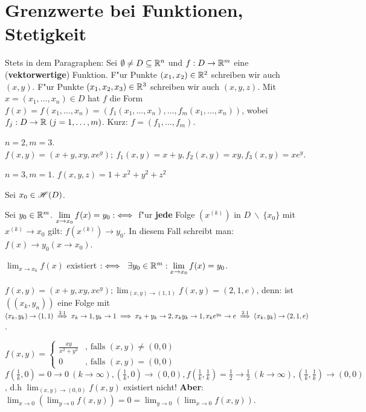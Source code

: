 \documentclass[a4paper,twoside,DIV15,BCOR12mm,chapterprefix=true,headings=twolinechapter]{scrbook}
\begin{document}
\chapter{Grenzwerte bei Funktionen, Stetigkeit}

\begin{vereinbarung}
Stets in dem Paragraphen: Sei $\emptyset \ne D \subseteq \mathbb{R}^n$ und $f: D\to\mathbb{R}^m$ eine (\textbf{vektorwertige}) Funktion. F"ur Punkte $(x_1, x_2) \in \mathbb{R}^2$ schreiben wir auch $(x,y)$. F"ur Punkte $(x_1, x_2, x_3) \in\mathbb{R}^3$ schreiben wir auch $(x, y, z)$. Mit $x=(x_1,\ldots,x_n)\in D$ hat $f$ die Form $f(x)=f(x_1,\ldots,x_n)=(f_1(x_1,\ldots,x_n),\ldots,f_m(x_1,\ldots,x_n))$, wobei $f_j:D\to\mathbb{R}\ (j=1,\ldots,m)$. Kurz: $f=(f_1,\ldots,f_m)$.
\end{vereinbarung}

\begin{beispiele}
\item $n=2,m=3$. $f(x,y)=(x+y,xy,xe^y);\ f_1(x,y)=x+y, f_2(x,y)=xy, f_3(x,y)=xe^y$.
\item $n=3,m=1$. $f(x,y,z)=1+x^2+y^2+z^2$
\end{beispiele}

\begin{definition*}
Sei $x_0\in \mathscr{H}(D)$.

\begin{liste}
\item Sei $y_0 \in \mathbb{R}^m$. $\displaystyle\lim_{x\to x_0}f(x)=y_0 :\iff$ f"ur \textbf{jede} Folge $(x^{(k)})$ in $D\ \backslash\ \{x_0\}$ mit $x^{(k)}\to x_0$ gilt: $f(x^{(k)})\to y_0$. In diesem Fall schreibt man: $f(x)\to y_0(x\to x_0)$.
\item $\displaystyle\lim_{x\to x_0}f(x)$ existiert $:\iff\ \exists y_0 \in \mathbb{R}^m: \displaystyle\lim_{x\to x_0}f(x)=y_0$.
\end{liste}
\end{definition*}

\begin{beispiele}
\item $f(x,y)=(x+y,xy,xe^y); \displaystyle\lim_{(x,y)\to(1,1)}f(x,y)=(2,1,e)$, denn: ist $((x_k, y_n))$ eine Folge mit $(x_k,y_k)\to(1,1)\folgtnach{2.1}x_k\to 1, y_k\to 1 \folgt x_k+y_k\to 2, x_ky_k\to 1, x_ke^{y_k}\to e\folgtnach{2.1}(x_k,y_k)\to(2,1,e)$.
\item $f(x,y)=\begin{cases}
\frac{xy}{x^2+y^2}&\text{, falls }(x,y)\ne(0,0)\\
0&\text{, falls }(x,y)=(0,0)
\end{cases}$\\
$f(\frac{1}{k},0)=0\to 0\ (k\to \infty), (\frac{1}{k},0)\to(0,0), f(\frac{1}{k},\frac{1}{k})=\frac{1}{2}\to\frac{1}{2}\ (k\to \infty), (\frac{1}{k},\frac{1}{k})\to(0,0)$, d.h $\displaystyle\lim_{(x,y)\to(0,0)}f(x,y)$ existiert nicht! \textbf{Aber}: $\displaystyle\lim_{x\to 0}(\displaystyle\lim_{y\to 0} f(x,y))=0=\displaystyle\lim_{y\to 0}(\displaystyle\lim_{x\to 0} f(x,y))$.
\end{beispiele}
\end{document}
